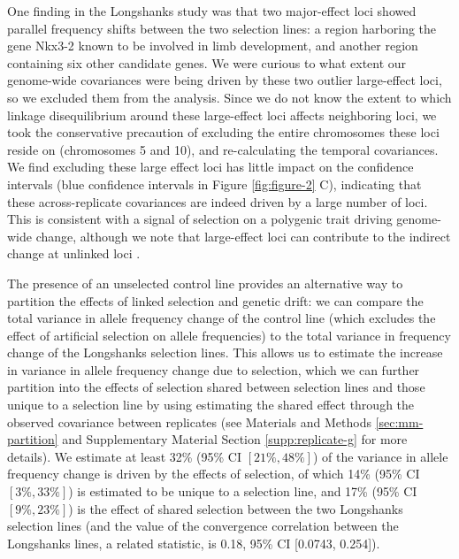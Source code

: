 \documentclass[11pt]{article}
\begin{document}
One finding in the Longshanks study was that two major-effect loci showed
parallel frequency shifts between the two selection lines: a region harboring
the gene Nkx3-2 known to be involved in limb development, and another region
containing six other candidate genes. We were curious to what extent our
genome-wide covariances were being driven by these two outlier large-effect
loci, so we excluded them from the analysis. Since we do not know the extent to
which linkage disequilibrium around these large-effect loci affects neighboring
loci, we took the conservative precaution of excluding the entire chromosomes
these loci reside on (chromosomes 5 and 10), and re-calculating the temporal
covariances. We find excluding these large effect loci has little impact on the
confidence intervals (blue confidence intervals in Figure \ref{fig:figure-2} C),
indicating that these across-replicate covariances are indeed driven by a large
number of loci. This is consistent with a signal of selection on a polygenic
trait driving genome-wide change, although we note that large-effect loci can
contribute to the indirect change at unlinked loci
\parencite{Robertson1961-ho,Santiago1995-hx}. 

The presence of an unselected control line provides an alternative way to
partition the effects of linked selection and genetic drift: we can compare the
total variance in allele frequency change of the control line (which excludes
the effect of artificial selection on allele frequencies) to the total variance
in frequency change of the Longshanks selection lines. This allows us to
estimate the increase in variance in allele frequency change due to selection,
which we can further partition into the effects of selection shared between
selection lines and those unique to a selection line by using estimating the
shared effect through the observed covariance between replicates (see Materials
and Methods \ref{sec:mm-partition} and Supplementary Material Section
\ref{supp:replicate-g} for more details).  We estimate at least 32\% (95\% CI
$[21\%, 48\%]$) of the variance in allele frequency change is driven by the
effects of selection, of which 14\% (95\% CI $[3\%, 33\%]$) is estimated to be
unique to a selection line, and 17\% (95\% CI $[9\%, 23\%]$) is the effect of
shared selection between the two Longshanks selection lines (and the value of
the convergence correlation between the Longshanks lines, a related statistic,
is 0.18, 95\% CI [0.0743, 0.254]).
\end{document}
